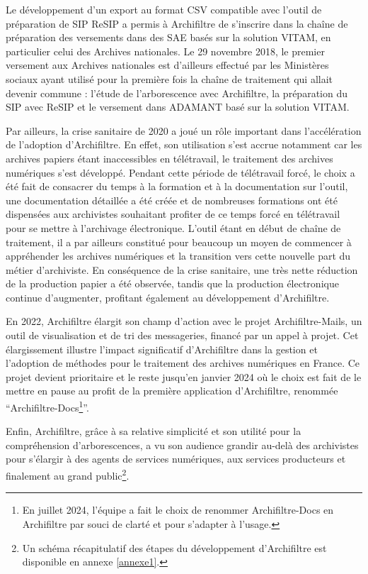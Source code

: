 

Le développement d’un export au format CSV compatible avec l’outil de préparation de \gls{SIP} ReSIP a permis à \gls{Archifiltre} de s’inscrire dans la chaîne de préparation des  versements dans des \gls{SAE} basés sur la solution \gls{VITAM}, en particulier celui des Archives nationales. Le 29 novembre 2018, le premier versement aux Archives nationales est d’ailleurs effectué par les Ministères sociaux ayant utilisé pour la première fois la chaîne de traitement qui allait devenir commune : l’étude de l’arborescence avec \gls{Archifiltre}, la préparation du \gls{SIP} avec ReSIP et le versement dans ADAMANT basé sur la solution \gls{VITAM}. 


Par ailleurs, la crise sanitaire de 2020 a joué un rôle important dans l'accélération de l'adoption d'\gls{Archifiltre}. En effet, son utilisation s’est accrue notamment car les archives papiers étant inaccessibles en télétravail, le traitement des archives numériques s’est développé. Pendant cette période de télétravail forcé, le choix a été fait de consacrer du temps à la formation et à la documentation sur l’outil, une documentation détaillée a été créée et de nombreuses formations ont été dispensées aux archivistes souhaitant profiter de ce temps forcé en télétravail pour se mettre à l’archivage électronique. L’outil étant en début de chaîne de traitement, il a par ailleurs constitué pour beaucoup un moyen de commencer à appréhender les archives numériques et la transition vers cette nouvelle part du métier d’archiviste. En conséquence de la crise sanitaire, une très nette réduction de la production papier a été observée, tandis que la production  électronique continue d’augmenter, profitant également au développement d’\gls{Archifiltre}.


En 2022, \gls{Archifiltre} élargit son champ d'action avec le projet Archifiltre-Mails, un outil de visualisation et de tri des messageries, financé par un appel à projet. Cet élargissement illustre l'impact significatif d'Archifiltre dans la gestion et l’adoption de méthodes pour le traitement des archives numériques en France. Ce projet devient prioritaire et le reste jusqu’en janvier 2024 où le choix est fait de le mettre en pause au profit de la première application d’\gls{Archifiltre}, renommée \enquote{Archifiltre-Docs\footnote{En juillet 2024, l’équipe a fait le choix de renommer Archifiltre-Docs en \gls{Archifiltre} par souci de clarté et pour s’adapter à l’usage.}}.


Enfin, \gls{Archifiltre}, grâce à sa relative simplicité et son utilité pour la compréhension d’arborescences, a vu son audience grandir au-delà des archivistes pour s’élargir à des agents de services numériques, aux services producteurs et finalement au grand public\footnote{Un schéma récapitulatif des étapes du développement d'Archifiltre est disponible en annexe \ref{annexe1}.}.
